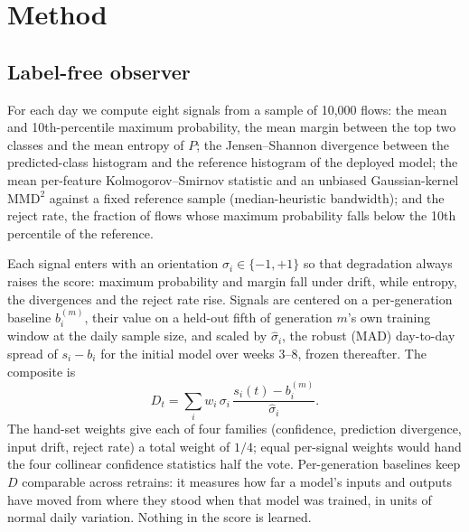 \documentclass[conference]{IEEEtran}
\begin{document}
\section{Method}
\subsection{Label-free observer}\label{sec:observer}
For each day we compute eight signals from a sample of 10,000 flows: the mean and 10th-percentile maximum probability, the mean margin between the top two classes and the mean entropy of $P$; the Jensen--Shannon divergence between the predicted-class histogram and the reference histogram of the deployed model; the mean per-feature Kolmogorov--Smirnov statistic and an unbiased Gaussian-kernel $\mathrm{MMD}^2$ \cite{gretton2012} against a fixed reference sample (median-heuristic bandwidth); and the reject rate, the fraction of flows whose maximum probability falls below the 10th percentile of the reference.

Each signal enters with an orientation $\sigma_i\in\{-1,+1\}$ so that degradation always raises the score: maximum probability and margin fall under drift, while entropy, the divergences and the reject rate rise. Signals are centered on a per-generation baseline $b_i^{(m)}$, their value on a held-out fifth of generation $m$'s own training window at the daily sample size, and scaled by $\hat\sigma_i$, the robust (MAD) day-to-day spread of $s_i-b_i$ for the initial model over weeks 3--8, frozen thereafter. The composite is
\begin{equation}
D_t=\sum_i w_i\,\sigma_i\,\frac{s_i(t)-b_i^{(m)}}{\hat\sigma_i}.
\end{equation}
The hand-set weights give each of four families (confidence, prediction divergence, input drift, reject rate) a total weight of $1/4$; equal per-signal weights would hand the four collinear confidence statistics half the vote. Per-generation baselines keep $D$ comparable across retrains: it measures how far a model's inputs and outputs have moved from where they stood when that model was trained, in units of normal daily variation. Nothing in the score is learned.
\end{document}
